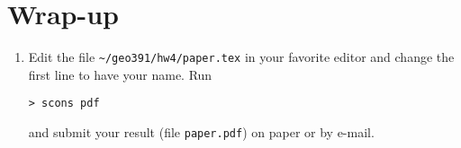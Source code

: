 \section{Wrap-up}

\begin{enumerate}  

\item 
Edit the file
\verb#~/geo391/hw4/paper.tex# in your favorite editor and 
change the first line to have your name. Run
\begin{verbatim}
> scons pdf
\end{verbatim}
and submit your result (file \texttt{paper.pdf}) on paper 
or by e-mail.

\end{enumerate}
